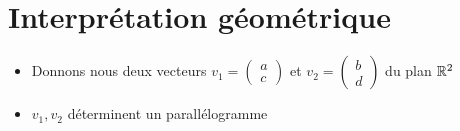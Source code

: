 \section{Interprétation géométrique}

\begin{frame}

\begin{itemize}
  \item<2-> Donnons nous deux vecteurs 
$v_1= \left(\begin{smallmatrix}a\\c\end{smallmatrix}\right)$ et 
$v_2= \left(\begin{smallmatrix}b\\d\end{smallmatrix}\right)$             
du plan $\mathbb{R}^2$ 

  \item<3->
$v_1,v_2$ déterminent un parallélogramme
\end{itemize}
\end{frame}


